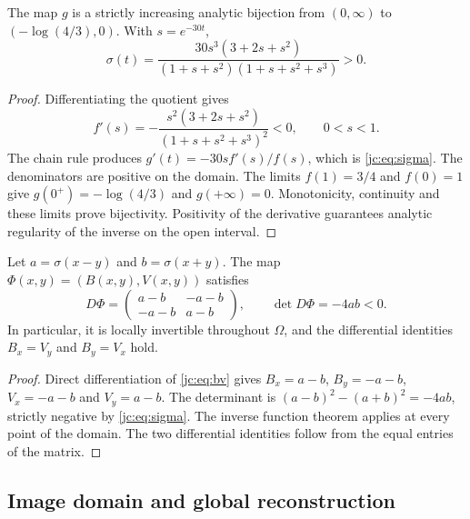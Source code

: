 \begin{lemma}
The map $g$ is a strictly increasing analytic bijection from $(0,\infty)$ to $(-\log(4/3),0)$. With $s=e^{-30t}$,
\begin{equation}
\sigma(t)=
\frac{30s^3(3+2s+s^2)}{(1+s+s^2)(1+s+s^2+s^3)}>0.
\label{jc:eq:sigma}
\end{equation}
\end{lemma}
\begin{proof}
Differentiating the quotient gives
\[
f'(s)=-\frac{s^2(3+2s+s^2)}{(1+s+s^2+s^3)^2}<0,
\qquad 0<s<1.
\]
The chain rule produces $g'(t)=-30s f'(s)/f(s)$, which is \eqref{jc:eq:sigma}. The denominators are positive on the domain. The limits $f(1)=3/4$ and $f(0)=1$ give $g(0^+)=-\log(4/3)$ and $g(+\infty)=0$. Monotonicity, continuity and these limits prove bijectivity. Positivity of the derivative guarantees analytic regularity of the inverse on the open interval.
\end{proof}

\begin{theorem}
\label{jc:thm:jacobiano} Let $a=\sigma(x-y)$ and $b=\sigma(x+y)$. The map $\Phi(x,y)=(B(x,y),V(x,y))$ satisfies
\begin{equation}
D\Phi=
\begin{pmatrix}a-b&-a-b\\-a-b&a-b\end{pmatrix},\qquad
\det D\Phi=-4ab<0.
\label{jc:eq:jacobiano}
\end{equation}
In particular, it is locally invertible throughout $\Omega$, and the differential identities $B_x=V_y$ and $B_y=V_x$ hold.
\end{theorem}
\begin{proof}
Direct differentiation of \eqref{jc:eq:bv} gives $B_x=a-b$, $B_y=-a-b$, $V_x=-a-b$ and $V_y=a-b$. The determinant is $(a-b)^2-(a+b)^2=-4ab$, strictly negative by \eqref{jc:eq:sigma}. The inverse function theorem applies at every point of the domain. The two differential identities follow from the equal entries of the matrix.
\end{proof}

\subsection{Image domain and global reconstruction}

